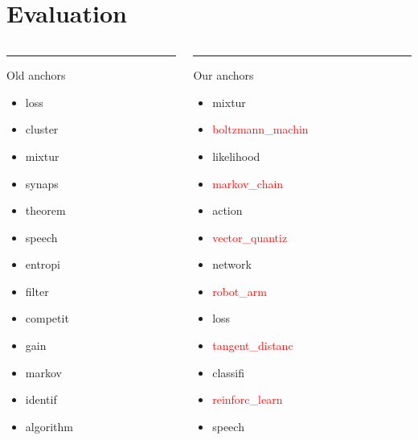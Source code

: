 \documentclass{beamer}
\begin{document}
\section*{Evaluation}
\begin{frame}
	\begin{columns}[T] %
		\begin{column}{.48\textwidth}
			\color{red}\rule{\linewidth}{4pt}
			
			Old anchors
			\begin{itemize}
				\item loss 
				\item cluster
				\item mixtur
				\item synaps
				\item theorem
				\item speech
				\item entropi
				\item filter
				\item competit
				\item gain
				\item markov
				\item identif
				\item algorithm 
			\end{itemize}
		\end{column}%
		\hfill%
		\begin{column}{.48\textwidth}
			\color{blue}\rule{\linewidth}{4pt}
			Our anchors
			
			\begin{itemize}
				\item mixtur
				\item \textcolor{red}{boltzmann\_machin}
				\item likelihood
				\item \textcolor{red}{markov\_chain}
				\item action
				\item \textcolor{red}{vector\_quantiz}
				\item network
				\item \textcolor{red}{robot\_arm}
				\item loss
				\item \textcolor{red}{tangent\_distanc}
				\item classifi
				\item \textcolor{red}{reinforc\_learn}
				\item speech
			\end{itemize}
			
			
		\end{column}%
	\end{columns}
	
\end{frame}
\end{document}

